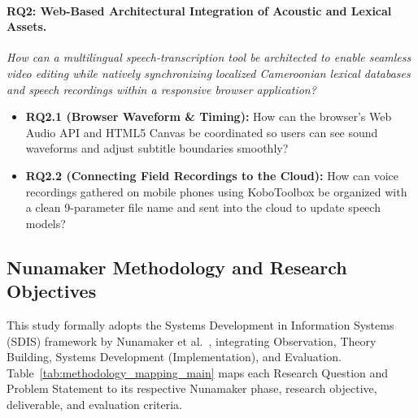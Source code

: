 \documentclass[a4paper,11pt]{article}
\begin{document}
\paragraph{\textbf{RQ2: Web-Based Architectural Integration of Acoustic and Lexical Assets.}}
\textit{How can a multilingual speech-transcription tool be architected to enable seamless video editing while natively synchronizing localized Cameroonian lexical databases and speech recordings within a responsive browser application?}
\begin{itemize}
    \item \textbf{RQ2.1 (Browser Waveform \& Timing):} How can the browser's Web Audio API and HTML5 Canvas be coordinated so users can see sound waveforms and adjust subtitle boundaries smoothly?
    \item \textbf{RQ2.2 (Connecting Field Recordings to the Cloud):} How can voice recordings gathered on mobile phones using KoboToolbox be organized with a clean 9-parameter file name and sent into the cloud to update speech models?
\end{itemize}

\subsection{Nunamaker Methodology and Research Objectives}
\label{sec:intro:methodology}

This study formally adopts the Systems Development in Information Systems (SDIS) framework by Nunamaker et al.~\cite{nunamaker1990systems}, integrating Observation, Theory Building, Systems Development (Implementation), and Evaluation. Table~\ref{tab:methodology_mapping_main} maps each Research Question and Problem Statement to its respective Nunamaker phase, research objective, deliverable, and evaluation criteria.
\end{document}
